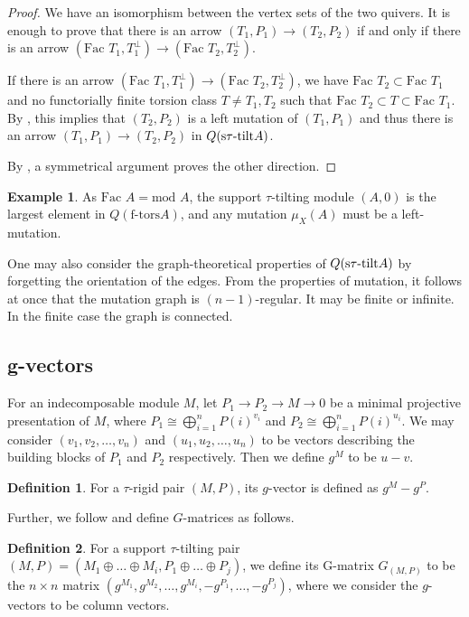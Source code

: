 \documentclass[]{article}
\theoremstyle{definition}
\newtheorem{definition}{Definition}[section]
\newtheorem{example}{Example}[section]
\newcommand{\tu}{\ensuremath{\tau}}
\newcommand{\Fac}{\ensuremath{\text{Fac }}}
\begin{document}
\begin{proof}
	We have an isomorphism between the vertex sets of the two quivers. It is enough to prove that there is an arrow $(T_1,P_1) \to (T_2,P_2)$ if and only if there is an arrow $(\Fac T_1,T_1^\perp) \to (\Fac T_2,T_2^\perp)$.
	
	If there is an arrow $(\Fac T_1,T_1^\perp) \to (\Fac T_2,T_2^\perp)$, we have $\Fac T_2 \subset \Fac T_1$ and no functorially finite torsion class $T \neq T_1,T_2$ such that $\Fac T_2 \subset T \subset \Fac T_1$. By \cite[Theorem 2.33]{tau}, this implies that $(T_2,P_2)$ is a left mutation of $(T_1,P_1)$ and thus there is an arrow $(T_1,P_1) \to (T_2,P_2)$ in $Q(\text{s\tu-tilt} A)$.
	
	By \cite[Theorem 2.33]{tau}, a symmetrical argument proves the other direction.	
\end{proof}

\begin{example}
	As $\Fac A=\text{mod } A$, the support \tu-tilting module $(A,0)$ is the largest element in $Q(\text{f-tors} A)$, and any mutation $\mu_X(A)$ must be a left-mutation.
\end{example}

One may also consider the graph-theoretical properties of $Q(\text{s\tu-tilt} A)$ by forgetting the orientation of the edges. From the properties of mutation, it follows at once that the mutation graph is $(n-1)$-regular. It may be finite or infinite. In the finite case the graph is connected\cite[Corollary 3.10]{tau}.

\subsection{g-vectors}
For an indecomposable module $M$, let $P_1 \to P_2 \to M \to 0$ be a minimal projective presentation of $M$, where $P_1 \cong \bigoplus_{i = 1}^n P(i)^{v_i}$ and $P_2 \cong \bigoplus_{i = 1}^n P(i)^{u_i}$. We may consider $(v_1,v_2,\dots,v_n)$ and $(u_1,u_2,\dots,u_n)$ to be vectors describing the building blocks of $P_1$ and $P_2$ respectively. Then we define $g^M$ to be $u - v$. 

\begin{definition}
	For a $\tau$-rigid pair $(M,P)$, its $g$-vector is defined as $g^M - g^P$. 
\end{definition}

Further, we follow \cite{schroll2020tautilting} and define $G$-matrices as follows.

\begin{definition}\cite[Definition 2.4]{schroll2020tautilting}
	For a support \tu-tilting pair $(M,P) = (M_1 \oplus \dots \oplus M_i,P_1 \oplus \dots \oplus P_j)$, we define its G-matrix $G_{(M,P)}$ to be the $n \times n$ matrix $(g^{M_1},g^{M_2},\dots,g^{M_i},-g^{P_1},\dots,-g^{P_j})$, where we consider the $g$-vectors to be column vectors.
	
\end{definition} 
\end{document}
